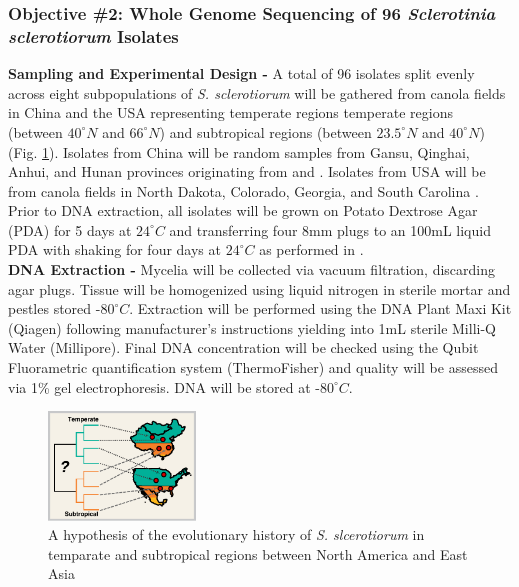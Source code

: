 \documentclass[12pt,letterpaper]{article}
\begin{document}
\subsubsection*{Objective \#2: Whole Genome Sequencing of 96 \textit{Sclerotinia sclerotiorum} Isolates}

\noindent \textbf{Sampling and Experimental Design -}
A total of 96 isolates split evenly across eight subpopulations of \textit{S. sclerotiorum} will be gathered from canola fields in China and the USA representing temperate regions temperate regions (between $40^{\circ}N$ and $66^{\circ}N$) and subtropical regions (between $23.5^{\circ}N$ and $40^{\circ}N$) (Fig. \ref{fig:us-china}).
Isolates from China will be random samples from Gansu, Qinghai, Anhui, and Hunan provinces originating from \citet{zhou2014dimethachlon} and \citet{attanayake2013sclerotinia}.
Isolates from USA will be from canola fields in North Dakota, Colorado, Georgia, and South Carolina \citep{aldrich-wolfe2015genetic,phillips2002phylogeography}.
Prior to DNA extraction, all isolates will be grown on Potato Dextrose Agar (PDA) for 5 days at $24^{\circ}C$ and transferring four 8mm plugs to an 100mL liquid PDA with shaking for four days at $24^{\circ}C$ as performed in \citet{derbyshire2017complete}.\\
\noindent \textbf{DNA Extraction -}
Mycelia will be collected via vacuum filtration, discarding agar plugs. Tissue will be homogenized using liquid nitrogen in sterile mortar and pestles stored -$80^{\circ}C$. Extraction will be performed using the DNA Plant Maxi Kit (Qiagen) following manufacturer's instructions yielding into 1mL sterile Milli-Q Water (Millipore). Final DNA concentration will be checked using the Qubit Fluorametric quantification system (ThermoFisher) and quality will be assessed via 1\% gel electrophoresis. DNA will be stored at -$80^{\circ}C$.\hspace*{\fill}
\begin{figure} %
  \includegraphics[width=0.35\textwidth]{figure/us-china.pdf}
  \caption{A hypothesis of the evolutionary history of \textit{S. slcerotiorum} in temparate and subtropical regions between North America and East Asia}
  \label{fig:us-china}
\end{figure}
\end{document}

